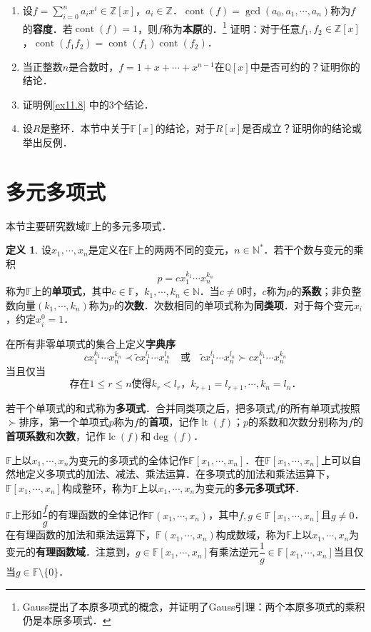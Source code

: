 \documentclass[a4paper,fontset=windows]{ctexbook}
\theoremstyle{definition}
\newtheorem{definition}{定义}[chapter]
\DeclareMathOperator{\cont}{cont}
\DeclareMathOperator{\lc}{lc}
\DeclareMathOperator{\lt}{lt}
\renewcommand{\le}{\leqslant}
\begin{document}
\begin{enumerate}
\item 设$f=\sum\limits_{i=0}^na_ix^i\in\mathbb{Z}[x]$，$a_i\in\mathbb{Z}$．$\cont(f)=\gcd(a_0,a_1,\cdots,a_n)$称为$f$的{\bf 容度}．若$\cont(f)=1$，则$f$称为{\bf 本原}的．\footnote{Gauss提出了本原多项式的概念，并证明了Gauss引理：两个本原多项式的乘积仍是本原多项式．} 证明：对于任意$f_1,f_2\in\mathbb{Z}[x]$，$\cont(f_1f_2)=\cont(f_1)\cont(f_2)$．

\item 当正整数$n$是合数时，$f=1+x+\cdots+x^{n-1}$在$\mathbb{Q}[x]$中是否可约的？证明你的结论．

\item 证明例\ref{ex11.8} 中的3个结论．

\item 设$R$是整环．本节中关于$\mathbb{F}[x]$的结论，对于$R[x]$是否成立？证明你的结论或举出反例．

\end{enumerate}

\clearpage\section{多元多项式}

本节主要研究数域$\mathbb{F}$上的多元多项式．

\begin{definition}
设$x_1,\cdots,x_n$是定义在$\mathbb{F}$上的两两不同的变元，$n\in\mathbb{N}^*$．若干个数与变元的乘积
$$p=cx_1^{k_1}\cdots x_n^{k_n}$$
称为$\mathbb{F}$上的{\bf 单项式}，其中$c\in\mathbb{F}$，$k_1,\cdots,k_n\in\mathbb{N}$．当$c\ne 0$时，$c$称为$p$的{\bf 系数}；非负整数向量$(k_1,\cdots,k_n)$称为$p$的{\bf 次数}．次数相同的单项式称为{\bf 同类项}．对于每个变元$x_i$，约定$x_i^0=1$．

在所有非零单项式的集合上定义{\bf 字典序}
$$cx_1^{k_1}\cdots x_n^{k_n}\prec\tilde{c}x_1^{l_1}\cdots x_n^{l_n}\quad\text{或}\quad\tilde{c}x_1^{l_1}\cdots x_n^{l_n}\succ cx_1^{k_1}\cdots x_n^{k_n}$$
当且仅当
$$\text{存在$1\le r\le n$使得$k_r<l_r$，$k_{r+1}=l_{r+1},\cdots,k_n=l_n$．}$$

若干个单项式的和式称为{\bf 多项式}．合并同类项之后，把多项式$f$的所有单项式按照$\succ$排序，第一个单项式$p$称为$f$的{\bf 首项}，记作$\lt(f)$；$p$的系数和次数分别称为$f$的{\bf 首项系数}和{\bf 次数}，记作$\lc(f)$和$\deg(f)$．

$\mathbb{F}$上以$x_1,\cdots,x_n$为变元的多项式的全体记作$\mathbb{F}[x_1,\cdots,x_n]$．在$\mathbb{F}[x_1,\cdots,x_n]$上可以自然地定义多项式的加法、减法、乘法运算．在多项式的加法和乘法运算下，$\mathbb{F}[x_1,\cdots,x_n]$构成整环，称为$\mathbb{F}$上以$x_1,\cdots,x_n$为变元的{\bf 多元多项式环}．

$\mathbb{F}$上形如$\dfrac{f}{g}$的有理函数的全体记作$\mathbb{F}(x_1,\cdots,x_n)$，其中$f,g\in\mathbb{F}[x_1,\cdots,x_n]$且$g\ne 0$．在有理函数的加法和乘法运算下，$\mathbb{F}(x_1,\cdots,x_n)$构成数域，称为$\mathbb{F}$上以$x_1,\cdots,x_n$为变元的{\bf 有理函数域}．注意到，$g\in\mathbb{F}[x_1,\cdots,x_n]$有乘法逆元$\dfrac{1}{g}\in\mathbb{F}[x_1,\cdots,x_n]$当且仅当$g\in\mathbb{F}\setminus\{0\}$．
\end{definition}
\end{document}

